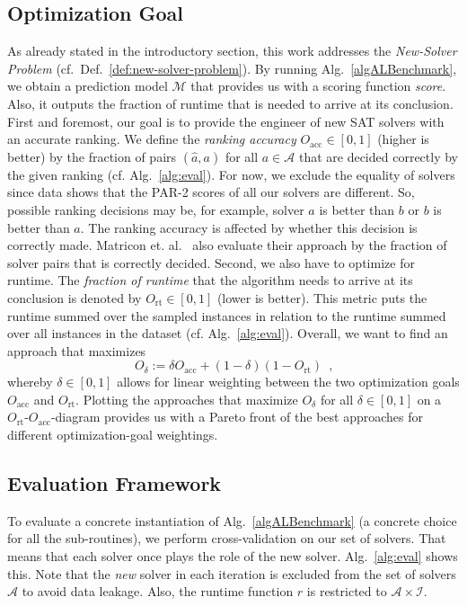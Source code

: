 \documentclass[runningheads]{llncs}
\begin{document}
\subsection{Optimization Goal}
\label{sec:goal}
As already stated in the introductory section, this work addresses the \emph{New-Solver Problem} (cf.~Def.~\ref{def:new-solver-problem}).
By running Alg.~\ref{algALBenchmark}, we obtain a prediction model $\mathcal{M}$ that provides us with a scoring function \emph{score}.
Also, it outputs the fraction of runtime that is needed to arrive at its conclusion.
First and foremost, our goal is to provide the engineer of new SAT solvers with an accurate ranking.
We define the \emph{ranking accuracy} $O_{\operatorname{acc}} \in \left[0, 1\right]$ (higher is better) by the fraction of pairs $\left(\hat{a}, a\right)$ for all $a \in \mathcal{A}$ that are decided correctly by the given ranking (cf. Alg.~\ref{alg:eval}).
For now, we exclude the equality of solvers since data shows that the PAR-2 scores of all our solvers are different.
So, possible ranking decisions may be, for example, solver $a$ is better than $b$ or $b$ is better than $a$.
The ranking accuracy is affected by whether this decision is correctly made.
Matricon et. al.~\cite{MatriconAFSH21} also evaluate their approach by the fraction of solver pairs that is correctly decided.
Second, we also have to optimize for runtime.
The \emph{fraction of runtime} that the algorithm needs to arrive at its conclusion is denoted by $O_{\operatorname{rt}} \in \left[0, 1\right]$ (lower is better).
This metric puts the runtime summed over the sampled instances in relation to the runtime summed over all instances in the dataset (cf. Alg.~\ref{alg:eval}).
Overall, we want to find an approach that maximizes
\begin{equation}
  O_\delta := \delta O_{\operatorname{acc}} + \left(1 - \delta\right) \left(1 - O_{\operatorname{rt}}\right) \enspace \textrm{,}
  \label{eq:opt}
\end{equation} 
whereby $\delta \in \left[0, 1\right]$ allows for linear weighting between the two optimization goals $O_{\operatorname{acc}}$ and $O_{\operatorname{rt}}$.
Plotting the approaches that maximize $O_\delta$ for all $\delta \in \left[0, 1\right]$ on a $O_{\operatorname{rt}}$-$O_{\operatorname{acc}}$-diagram provides us with a Pareto front of the best approaches for different optimization-goal weightings.

\subsection{Evaluation Framework}
\label{sec:evalframe}
To evaluate a concrete instantiation of Alg.~\ref{algALBenchmark} (a concrete choice for all the sub-routines), we perform cross-validation on our set of solvers.
That means that each solver once plays the role of the new solver.
Alg.~\ref{alg:eval} shows this.
Note that the \emph{new} solver in each iteration is excluded from the set of solvers $\mathcal{A}$ to avoid data leakage.
Also, the runtime function $r$ is restricted to $\mathcal{A} \times \mathcal{I}$.
\end{document}
